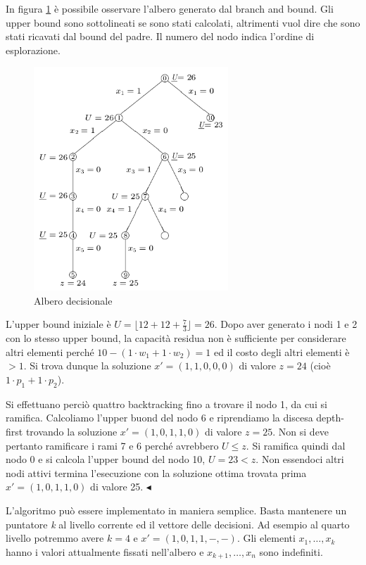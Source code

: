 \documentclass[11pt]{book}
\begin{document}
In figura \ref{cap6fig613} \`e possibile osservare l'albero generato
dal branch and bound. Gli upper bound sono sottolineati se sono stati
calcolati, altrimenti vuol dire che sono stati ricavati dal bound del
padre. Il numero del nodo indica l'ordine di esplorazione.

\begin{figure}[h!]
  \centering
  \includegraphics[width=0.65\textwidth]{images/cap6fig613.png}
  \caption{Albero decisionale}
  \label{cap6fig613}
\end{figure}

L'upper bound iniziale \`e $U = \lfloor 12+12+\frac{7}{3} \rfloor =
26$. Dopo aver generato i nodi 1 e 2 con lo stesso upper bound, la
capacit\`a residua non \`e sufficiente per considerare altri elementi
perch\'e $10 - (1\cdot w_1 + 1\cdot w_2) = 1$ ed il costo degli altri
elementi \`e $> 1$. Si trova dunque la soluzione $x'=(1,1,0,0,0)$ di
valore $z=24$ (cio\`e $1\cdot p_1 + 1\cdot p_2$).

Si effettuano perci\`o quattro backtracking fino a trovare il nodo 1,
da cui si ramifica. Calcoliamo l'upper buond del nodo 6 e riprendiamo
la discesa depth-first trovando la soluzione $x' = (1,0,1,1,0)$ di
valore $z=25$. Non si deve pertanto ramificare i rami 7 e 6 perch\'e
avrebbero $U \leq z$. Si ramifica quindi dal nodo 0 e si calcola
l'upper bound del nodo 10, $U = 23 < z$. Non essendoci altri nodi
attivi termina l'esecuzione con la soluzione ottima trovata prima
$x'=(1,0,1,1,0)$ di valore 25. $\blacktriangleleft$
\vspace{11pt}

L'algoritmo pu\`o essere implementato in maniera semplice. Basta
mantenere un puntatore {\em k} al livello corrente ed il vettore delle
decisioni. Ad esempio al quarto livello potremmo avere $k=4$ e
$x'=(1,0,1,1,-,-)$. Gli elementi $x_1,\dots,x_k$ hanno i valori
attualmente fissati nell'albero e $x_{k+1},\dots,x_n$ sono indefiniti.
\end{document}
